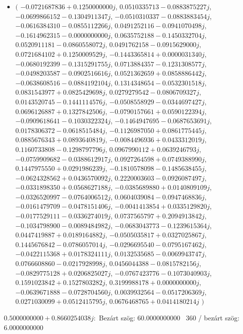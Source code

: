 \documentclass[14pt,a4paper]{article}
\begin{document}
\begin{itemize}
\item
$\big($
$-0.0721687836+0.1250000000j$, $0.0510335713-0.0883875227j$, $-0.0699866152-0.1304911347j$, $-0.0510310337-0.0883883454j$, $-0.0616384310-0.0855112266j$, $0.0491252116-0.0941070498j$, $-0.1614962315-0.0000000000j$, $0.0635752188-0.1450332704j$, $0.0520911181-0.0860558072j$, $0.0491762158-0.0915629000j$, $0.0721684102+0.1250009529j$, $-0.1443365814+0.0000031340j$, $-0.0680192399-0.1315291755j$, $0.0713884357-0.1231308577j$, $-0.0498203587-0.0902516616j$, $0.0521362659+0.0858886442j$, $-0.0638608516-0.0884192104j$, $0.1314348654-0.0532301518j$, $0.0831543977+0.0825429698j$, $0.0279279542-0.0806709327j$, $0.0143520745-0.1441114576j$, $-0.0508558929-0.0344697427j$, $0.0696126887+0.1327842506j$, $-0.0790157661+0.0590122394j$, $-0.0909618641-0.1030322324j$, $-0.1464947695-0.0687653691j$, $0.0178306372-0.0618515484j$, $-0.1126987050+0.0861775445j$, $0.0885676343+0.0893640819j$, $-0.0084496936+0.0433312019j$, $0.1160733808-0.1298797796j$, $0.0967990112+0.0639246793j$, $-0.0759909682-0.0388612917j$, $0.0927264598+0.0749388990j$, $0.1447975550+0.0291986239j$, $-0.1810578098-0.1485638455j$, $-0.0624328562+0.0436570092j$, $0.2220003603-0.0926087497j$, $-0.0331898350+0.0568627188j$, $-0.0385689880+0.0140809109j$, $-0.0326520997-0.0764006512j$, $0.0604039084-0.0947468836j$, $-0.0161479709-0.0478151406j$, $-0.0041413854+0.0335129820j$, $-0.0177529111-0.0336274019j$, $0.0737565797+0.2094913842j$, $-0.1034798900-0.0089484982j$, $-0.0683043773-0.1239615364j$, $0.0447419887+0.0189164882j$, $-0.0505035817+0.0327025867j$, $0.1445676842-0.0786057014j$, $-0.0296695540-0.0795167462j$, $-0.0422115368+0.0178324111j$, $0.0132535685-0.0069943747j$, $0.0766608860-0.0217928998j$, $0.0456044388-0.0815782156j$, $-0.0829775128+0.0206825027j$, $-0.0767423776-0.1073040903j$, $0.1591023842+0.1527803282j$, $0.3199988178+0.0000000000j$, $-0.0639671888-0.0728704560j$, $0.0039932564-0.0517206369j$, $0.0271030099+0.0512415795j$, $0.0676468765+0.0414180214j$
$\big)$
\end{itemize}
$0.5000000000+0.8660254038j$:\
Bezárt szög: $60.0000000000$ \
360 / bezárt szög: $6.0000000000$\
\end{document}
